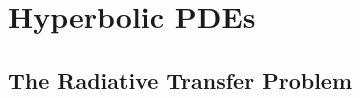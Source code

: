 \documentclass{beamer}
\newcommand{\bunderline}[1]{\underline{#1}}
\renewcommand{\vec}[1]{{\bunderline{#1}}}
\newcommand{\mat}[1]{{\bunderline{\bunderline{#1}}}}
\begin{document}



\section{Hyperbolic PDEs}
\subsection{The Radiative Transfer Problem}
\end{document}
